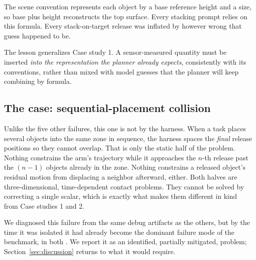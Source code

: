 The scene convention represents each object by a base reference height
and a size, so base plus height reconstructs the top surface. Every
stacking prompt relies on this formula.  Every stack-on-target release was
inflated by however wrong that guess happened to be.

The lesson generalizes Case study 1. A sensor-measured quantity must be
inserted \emph{into the representation the planner already expects},
consistently with its conventions, rather than mixed with model
guesses that the planner will keep combining by formula.

\subsection{The  case: sequential-placement collision}
\label{sec:case-collision}

Unlike the five other failures, this one is not  by the
harness. When a task places several objects into the same zone in
sequence, the harness spaces the \emph{final} release positions so
they cannot overlap. That is only the static half of the problem.
Nothing constrains the arm's trajectory while it approaches the
$n$-th release past the $(n-1)$ objects already in the zone. Nothing
constrains a released object's residual motion from displacing a
neighbor afterward, either. Both halves are three-dimensional,
time-dependent contact problems. They cannot be solved by correcting a
single scalar, which is exactly what makes them different in kind from
Case studies 1 and 2.

We diagnosed this failure from the same debug artifacts as the others,
but by the time it was isolated it had already become the dominant
failure mode of the benchmark, in both . We
report it as an identified, partially mitigated, 
problem; Section~\ref{sec:discussion} returns to what 
it would require.
